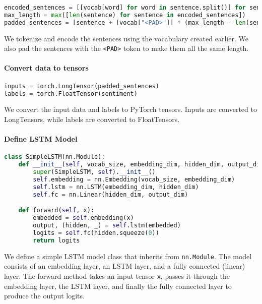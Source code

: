 \begin{lstlisting}[language=Python]
encoded_sentences = [[vocab[word] for word in sentence.split()] for sentence in sentences]
max_length = max([len(sentence) for sentence in encoded_sentences])
padded_sentences = [sentence + [vocab["<PAD>"]] * (max_length - len(sentence)) for sentence in encoded_sentences]
\end{lstlisting}

We tokenize and encode the sentences using the vocabulary created
earlier. We also pad the sentences with the
\lstinline{<PAD>} token to make them all the same length.

\paragraph{Convert data to tensors}\label{convert-data-to-tensors}

\begin{lstlisting}[language=Python]
inputs = torch.LongTensor(padded_sentences)
labels = torch.FloatTensor(sentiment)
\end{lstlisting}

We convert the input data and labels to PyTorch tensors. Inputs are
converted to LongTensors, while labels are converted to FloatTensors.

\paragraph{Define LSTM Model}\label{define-lstm-model}

\begin{lstlisting}[language=Python]
class SimpleLSTM(nn.Module):
    def __init__(self, vocab_size, embedding_dim, hidden_dim, output_dim):
        super(SimpleLSTM, self).__init__()
        self.embedding = nn.Embedding(vocab_size, embedding_dim)
        self.lstm = nn.LSTM(embedding_dim, hidden_dim)
        self.fc = nn.Linear(hidden_dim, output_dim)

    def forward(self, x):
        embedded = self.embedding(x)
        output, (hidden, _) = self.lstm(embedded)
        logits = self.fc(hidden.squeeze(0))
        return logits
\end{lstlisting}

We define a simple LSTM model class that inherits from
\lstinline{nn.Module}. The model consists of an embedding
layer, an LSTM layer, and a fully connected (linear) layer. The forward
method takes an input tensor \lstinline{x}, passes it
through the embedding layer, the LSTM layer, and finally the fully
connected layer to produce the output logits.

